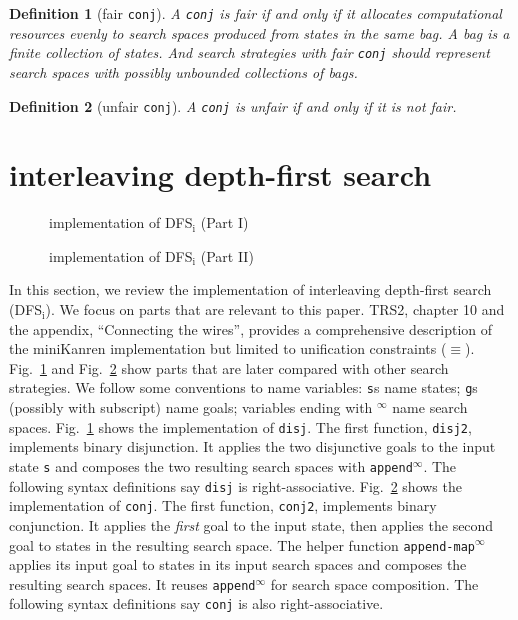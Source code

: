 \documentclass[format=acmlarge, review=true, authordraft=true]{acmart}
\newcommand{\conde}{\texttt{cond$^e$}}
\newcommand{\conj}{\texttt{conj}}
\newcommand{\disj}{\texttt{disj}}
\newcommand{\DFSi }[0]{DFS$_\textrm{i}$}
\newtheorem{defn}{Definition}[section]
\begin{document}
\begin{defn}[fair \conj{}]
A \conj{} is fair if and only if it allocates computational resources evenly to 
search spaces produced from states in the same bag. A bag is a finite 
collection of states. And search strategies with fair \conj{} should represent 
search spaces with possibly unbounded collections of bags. 
\end{defn}

\begin{defn}[unfair \conj{}]
A \conj{} is unfair if and only if it is not fair.
\end{defn}





\section{interleaving depth-first search}

\begin{figure}
	
	\caption{implementation of \DFSi{} (Part I)}
	\label{DFSi-0}
\end{figure}

\begin{figure}
	
	\caption{implementation of \DFSi{} (Part II)}
	\label{DFSi-1}
\end{figure}

In this section, we review the implementation of interleaving depth-first 
search (\DFSi). We focus on parts that are relevant to this paper. TRS2,
chapter 10 and the appendix, ``Connecting the wires'', 
provides a comprehensive description of the 
miniKanren 
implementation but limited to unification constraints ($\equiv$).
Fig.~\ref{DFSi-0} and Fig.~\ref{DFSi-1} show parts that are later compared 
with other search 
strategies. We follow some conventions to name variables: \texttt{s}s name 
states; \texttt{g}s (possibly with subscript) name goals; 
variables ending with $^\infty$ name search spaces. Fig.~\ref{DFSi-0} shows the 
implementation of \disj. The 
first function, \texttt{disj2}, implements binary disjunction. It applies the 
two disjunctive goals to the input state \texttt{s} and composes the two 
resulting search spaces with \texttt{append$^\infty$}. The following syntax 
definitions say \disj{} is right-associative. Fig.~\ref{DFSi-1} 
shows the implementation of \conj. The first function, \texttt{conj2}, 
implements binary conjunction. 
It applies the \emph{first} goal to the input state, then applies the second 
goal to states in the resulting search space. The helper function 
\texttt{append-map$^\infty$} applies its input goal to states 
in its input search spaces and composes the resulting search spaces. It reuses 
\texttt{append$^\infty$} for search space composition. The following syntax 
definitions say \conj{} is also right-associative.
% 	
% 
\end{document}
